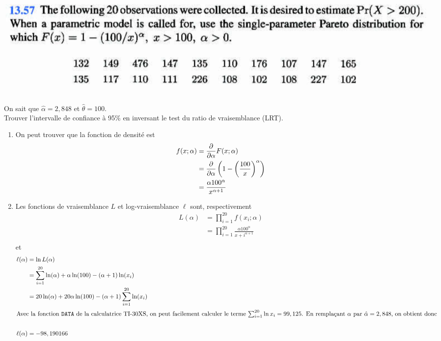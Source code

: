 \documentclass[12pt, french]{report}
\begin{document}
\begin{exemple}
\begin{center}
\includegraphics[scale=0.3]{src/LM-Q13-57.png}
\end{center}
On sait que $\hat{\alpha} = 2,848$ et $\hat{\theta} = 100$. \\
Trouver l'intervalle de confiance à 95\% en inversant le test du ratio de vraisemblance (LRT).
\tcblower %
\begin{enumerate}[label=(\arabic*)]
\item On peut trouver que la fonction de densité est
\begin{align*}
f(x ; \alpha)	& = \frac{\partial}{\partial \alpha} F(x ; \alpha) \\
& = \frac{\partial}{\partial \alpha} \left( 1 - \left( \frac{100}{x} \right)^\alpha \right) \\
& = \frac{\alpha 100^\alpha}{x^{\alpha+1}} \\
\end{align*}

\item Les fonctions de vraisemblance $L$ et log-vraisemblance $\ell$ sont, respectivement
\begin{align*}
L(\alpha)	& = \prod_{i=1}^{20} f(x_i ; \alpha) \\
& = \prod_{i=1}^{20} \frac{\alpha 100^\alpha}{x+i^{\alpha+1}}  \\
\end{align*}
et 
\begin{align*}
\ell(\alpha)	& = \ln L(\alpha) \\
& = \sum_{i=1}^{20} \ln (\alpha) + \alpha \ln (100) - (\alpha+1) \ln (x_i) \\
& = 20 \ln (\alpha) + 20 \alpha  \ln (100) - (\alpha + 1) \sum_{i=1}^{20} \ln (x_i) \\
\shortintertext{Avec la fonction \texttt{DATA} de la calculatrice TI-30XS, on peut facilement calculer le terme $\sum_{i=1}^{20} \ln x_i = 99,125$. En remplaçant $\alpha$ par $\hat{\alpha} = 2,848$, on obtient donc} \\
\ell(\alpha) & = - 98,190166 \\
\end{align*}


\end{enumerate}
\end{exemple}
\end{document}
